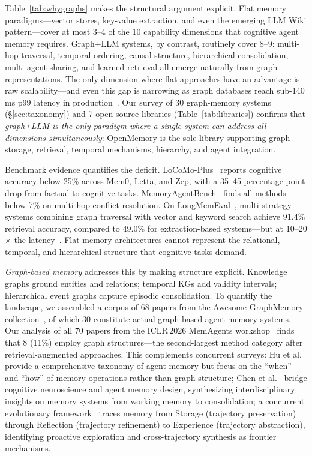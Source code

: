 \documentclass[hf]{ceurart}
\begin{document}
Table~\ref{tab:whygraphs} makes the structural argument explicit.
Flat memory paradigms---vector stores, key-value extraction, and even
the emerging LLM Wiki pattern---cover at most 3--4 of the 10 capability
dimensions that cognitive agent memory requires. Graph+LLM systems, by
contrast, routinely cover 8--9: multi-hop traversal, temporal ordering,
causal structure, hierarchical consolidation, multi-agent sharing, and
learned retrieval all emerge naturally from graph representations.
The only dimension where flat approaches have an advantage is raw
scalability---and even this gap is narrowing as graph databases reach
sub-140\,ms p99 latency in production~\cite{falkordb2025}. Our survey
of 30 graph-memory systems (\S\ref{sec:taxonomy}) and 7 open-source
libraries (Table~\ref{tab:libraries}) confirms that \emph{graph+LLM is
the only paradigm where a single system can address all dimensions
simultaneously}: OpenMemory is the sole library supporting graph
storage, retrieval, temporal mechanisms, hierarchy, and agent
integration.

Benchmark evidence quantifies the deficit.
LoCoMo-Plus~\cite{gurawaliya2026} reports cognitive accuracy below 25\%
across Mem0, Letta, and Zep, with a 35--45 percentage-point drop from
factual to cognitive tasks. MemoryAgentBench~\cite{memoryagentbench2026}
finds all methods below 7\% on multi-hop conflict resolution.
On LongMemEval~\cite{longmemeval2025}, multi-strategy systems combining
graph traversal with vector and keyword search achieve 91.4\% retrieval
accuracy, compared to 49.0\% for extraction-based
systems---but at 10--20$\times$ the latency~\cite{vectorize2026}.
Flat memory architectures cannot represent the relational, temporal,
and hierarchical structure that cognitive tasks demand.

\emph{Graph-based memory} addresses this by making structure explicit.
Knowledge graphs ground entities and relations; temporal KGs add validity
intervals; hierarchical event graphs capture episodic consolidation.
To quantify the landscape, we assembled a corpus of 68 papers from
the Awesome-GraphMemory collection~\cite{graphmemsurvey2026}, of which
30 constitute actual graph-based agent memory systems. Our analysis of
all 70 papers from the ICLR\,2026 MemAgents
workshop~\cite{memagents2026} finds that 8 (11\%) employ graph
structures---the second-largest method category after
retrieval-augmented approaches. This complements concurrent surveys:
Hu et al.~\cite{memoryinage2025} provide a comprehensive taxonomy of
agent memory but focus on the ``when'' and ``how'' of memory operations
rather than graph structure; Chen et al.~\cite{aimeetsbrain2025} bridge
cognitive neuroscience and agent memory design, synthesizing
interdisciplinary insights on memory systems from working memory to
consolidation; a concurrent evolutionary framework~\cite{storage2exp2026}
traces memory from Storage (trajectory preservation) through
Reflection (trajectory refinement) to Experience (trajectory
abstraction), identifying proactive exploration and cross-trajectory
synthesis as frontier mechanisms.
\end{document}
